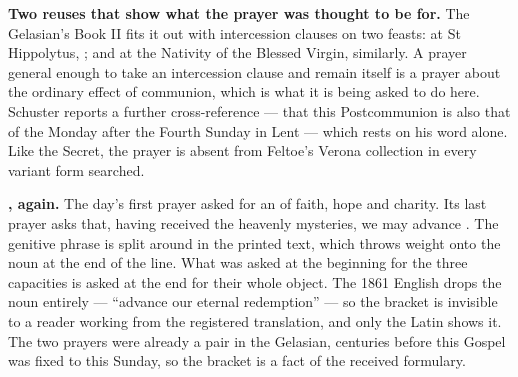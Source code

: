 \textbf{Two reuses that show what the prayer was thought to be for.} The
Gelasian's Book II fits it out with intercession clauses on two feasts: at St
Hippolytus, ; and at the
Nativity of the Blessed Virgin, similarly. A prayer general enough to take an
intercession clause and remain itself is a prayer about the ordinary effect of
communion, which is what it is being asked to do here. Schuster reports a
further cross-reference --- that this Postcommunion is also that of the Monday
after the Fourth Sunday in Lent --- which rests on his word alone. Like
the Secret, the prayer is absent from Feltoe's Verona collection in every
variant form searched.

\textbf{, again.} The day's first prayer asked for an
 of faith, hope and charity. Its last prayer asks that, having
received the heavenly mysteries, we may advance . The genitive phrase is split around  in the
printed text, which throws weight onto the noun at the end of the line. What
was asked at the beginning for the three capacities is asked at the end for
their whole object. The 1861 English drops the noun entirely --- ``advance our
eternal redemption'' --- so the bracket is invisible to a reader working from
the registered translation, and only the Latin shows it. The two prayers were
already a pair in the Gelasian, centuries before this Gospel
was fixed to this Sunday, so the bracket is a fact of the received formulary.
